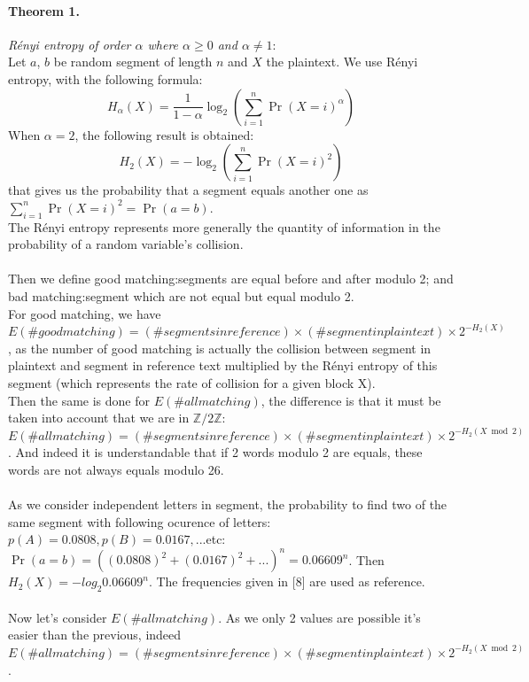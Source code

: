 \documentclass{article}
\begin{document}
\paragraph{Theorem 1.}\textit{R\'enyi entropy of order $\alpha$ where $\alpha \geq 0$ and $\alpha \neq 1$}:
\\
Let $a$, $b$ be random segment of length $n$ and $X$ the plaintext. We use R\'enyi entropy, with the following formula:\\
$$H_{\alpha}(X) = \frac{1}{1-\alpha}\log_{2}(\sum_{i=1}^{n}{\Pr(X=i)^{\alpha}})$$ 
When $\alpha = 2$, the following result is obtained:
$$H_{2}(X) = -\log_{2}(\sum_{i=1}^{n}{\Pr(X=i)^{2}})$$ that gives us the probability that a segment equals another one as $\sum_{i=1}^{n}{\Pr(X=i)^{2}} =\Pr(a=b)$.\\
The R\'enyi entropy represents more generally the quantity of information in the probability of a random variable's collision.\\
\\
Then we define good matching:segments are equal before and after modulo 2; and bad matching:segment which are not equal but equal modulo 2.\\
${}$\hspace{1em}For good matching, we have $E(\# good matching) = (\# segments in reference) \times (\#segment in plaintext) \times 2^{-H_{2}(X)}$, as the number of good matching is actually the collision between segment in plaintext and segment in reference text multiplied by the R\'enyi entropy of this segment (which represents the rate of collision for a given block X).\\
Then the same is done for  $E(\# all matching)$, the difference is that it must be taken into account that we are in $\mathbb{Z}/2\mathbb{Z}$:$E(\# all matching) = (\# segments in reference) \times (\#segment in plaintext) \times 2^{-H_{2}(X \bmod 2)}$ . And indeed it is understandable that if 2 words modulo 2 are equals, these words are not always equals modulo 26.\\
\\
As we consider independent letters in segment, the probability to find two of the same segment with following ocurence of letters:$p(A)=0.0808, p(B)=0.0167,...$etc:$\Pr(a=b)=((0.0808)^{2} +(0.0167)^{2} + ...)^{n} =0.06609^{n}$. Then $H_{2}(X) = -log_{2}0.06609^{n}$. The frequencies given in [8] are used as reference.\\
\\
${}$\hspace{1em}Now let's consider $E(\# all matching)$. As we only 2 values are possible it's easier than the previous, indeed $E(\# all matching) =(\# segments in reference) \times (\#segment in plaintext) \times 2^{-H_{2}(X \bmod 2)}$.\\
\end{document}

